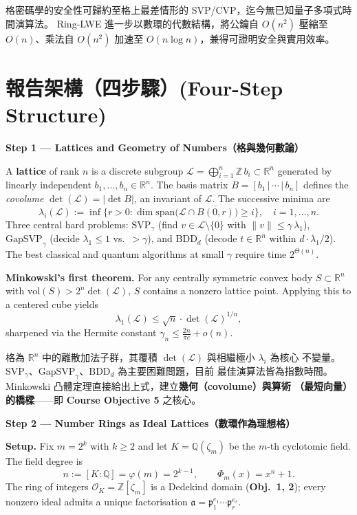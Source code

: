 \documentclass[12pt, a4paper]{article}
\begin{document}
格密碼學的安全性可歸約至格上最差情形的 SVP/CVP，迄今無已知量子多項式時間演算法。
Ring-LWE 進一步以數環的代數結構，將公鑰自 $O(n^2)$ 壓縮至 $O(n)$、乘法自 $O(n^2)$
加速至 $O(n\log n)$，兼得可證明安全與實用效率。

\section{報告架構（四步驟）\small\normalfont\color{gray}(Four-Step Structure)}

\textbf{Step 1 --- Lattices and Geometry of Numbers（格與幾何數論）}

A \textbf{lattice} of rank $n$ is a discrete subgroup
$\mathcal{L} = \bigoplus_{i=1}^{n}\mathbb{Z}\,b_i \subset \mathbb{R}^n$
generated by linearly independent $b_1,\ldots,b_n\in\mathbb{R}^n$. The basis matrix
$B=[b_1\,|\,\cdots\,|\,b_n]$ defines the \textit{covolume} $\det(\mathcal{L})=|\det B|$,
an invariant of $\mathcal{L}$. The successive minima are
\[
  \lambda_i(\mathcal{L}) := \inf\bigl\{r>0 : \dim\mathrm{span}\bigl(\mathcal{L}\cap\overline{B(0,r)}\bigr)\geq i\bigr\}, \quad i=1,\ldots,n.
\]
Three central hard problems: $\mathrm{SVP}_\gamma$ (find $v\in\mathcal{L}\setminus\{0\}$ with
$\|v\|\leq\gamma\,\lambda_1$), $\mathrm{GapSVP}_\gamma$ (decide $\lambda_1\leq 1$ vs.\ $>\gamma$),
and $\mathrm{BDD}_d$ (decode $t\in\mathbb{R}^n$ within $d\cdot\lambda_1/2$). The best classical
and quantum algorithms at small $\gamma$ require time $2^{\Theta(n)}$.

\textbf{Minkowski's first theorem.} For any centrally symmetric convex body $S\subset\mathbb{R}^n$
with $\mathrm{vol}(S)>2^n\det(\mathcal{L})$, $S$ contains a nonzero lattice point. Applying
this to a centered cube yields
\[
  \lambda_1(\mathcal{L}) \leq \sqrt{n}\cdot\det(\mathcal{L})^{1/n},
\]
sharpened via the Hermite constant $\gamma_n\leq\tfrac{2n}{\pi e}+o(n)$.

格為 $\mathbb{R}^n$ 中的離散加法子群，其覆積 $\det(\mathcal{L})$ 與相繼極小 $\lambda_i$ 為核心
不變量。$\mathrm{SVP}_\gamma$、$\mathrm{GapSVP}_\gamma$、$\mathrm{BDD}_d$ 為主要困難問題，目前
最佳演算法皆為指數時間。Minkowski 凸體定理直接給出上式，建立\textbf{幾何（covolume）與算術
（最短向量）的橋樑}——即 \textbf{Course Objective 5} 之核心。

\medskip
\textbf{Step 2 --- Number Rings as Ideal Lattices（數環作為理想格）}

\textbf{Setup.} Fix $m=2^k$ with $k\geq 2$ and let $K=\mathbb{Q}(\zeta_m)$ be the $m$-th
cyclotomic field. The field degree is
\[
  n := [K:\mathbb{Q}] = \varphi(m) = 2^{k-1}, \qquad \Phi_m(x) = x^n + 1.
\]
The ring of integers $\mathcal{O}_K=\mathbb{Z}[\zeta_m]$ is a Dedekind domain
(\textbf{Obj.\ 1, 2}); every nonzero ideal admits a unique factorisation
$\mathfrak{a}=\mathfrak{p}_1^{e_1}\cdots\mathfrak{p}_r^{e_r}$.
\end{document}
